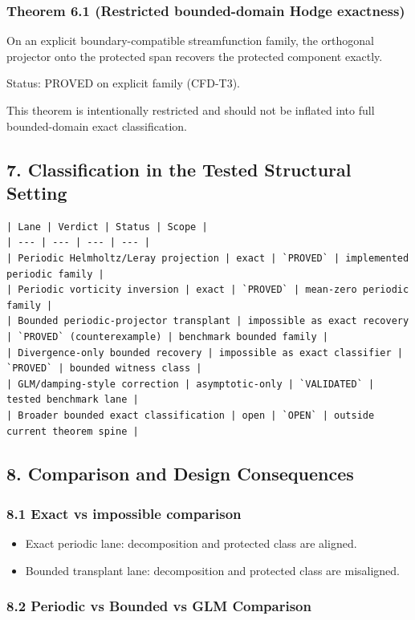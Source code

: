 \documentclass[11pt]{article}
\begin{document}
\subsubsection*{Theorem 6.1 (Restricted bounded-domain Hodge exactness)}
On an explicit boundary-compatible streamfunction family, the orthogonal projector onto the protected span recovers the protected component exactly.


Status: PROVED on explicit family (CFD-T3).


This theorem is intentionally restricted and should not be inflated into full bounded-domain exact classification.


\subsection*{7. Classification in the Tested Structural Setting}

\begin{verbatim}
| Lane | Verdict | Status | Scope |
| --- | --- | --- | --- |
| Periodic Helmholtz/Leray projection | exact | `PROVED` | implemented periodic family |
| Periodic vorticity inversion | exact | `PROVED` | mean-zero periodic family |
| Bounded periodic-projector transplant | impossible as exact recovery | `PROVED` (counterexample) | benchmark bounded family |
| Divergence-only bounded recovery | impossible as exact classifier | `PROVED` | bounded witness class |
| GLM/damping-style correction | asymptotic-only | `VALIDATED` | tested benchmark lane |
| Broader bounded exact classification | open | `OPEN` | outside current theorem spine |
\end{verbatim}

\subsection*{8. Comparison and Design Consequences}

\subsubsection*{8.1 Exact vs impossible comparison}
\begin{itemize}
\item Exact periodic lane: decomposition and protected class are aligned.
\item Bounded transplant lane: decomposition and protected class are misaligned.
\end{itemize}

\subsubsection*{8.2 Periodic vs Bounded vs GLM Comparison}
\end{document}
